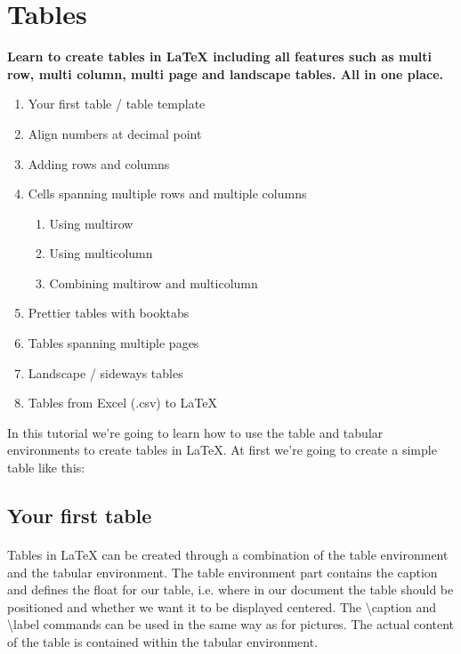 
\maketitle
\newpage
\section{Tables}
  \textbf{
    Learn to create tables in LaTeX including all features such as multi row, multi column, multi page and landscape tables. All in one place.
  }
  \begin{enumerate} %
    \item Your first table / table template
    \item Align numbers at decimal point
    \item Adding rows and columns
    \item Cells spanning multiple rows and multiple columns
      \begin{enumerate}
        \item Using multirow
        \item Using multicolumn
        \item Combining multirow and multicolumn
      \end{enumerate}
    \item Prettier tables with booktabs
    \item Tables spanning multiple pages
    \item Landscape / sideways tables
    \item Tables from Excel (.csv) to LaTeX
  \end{enumerate} 
  In this tutorial we're going to learn how to use the table and tabular environments to create tables in LaTeX. At first we're going to create a simple table like this:
  
  \subsection{Your first table}
  \paragraph{}
    Tables in LaTeX can be created through a combination 
    of the table environment and the tabular environment. 
    The table environment part contains the caption and 
    defines the float for our table, i.e. where in our 
    document the table should be positioned and whether 
    we want it to be displayed centered. The
    \textbackslash caption and \textbackslash label commands 
    can be used in the same way as for pictures. 
    The actual content of the table is contained 
    within the tabular environment.
  
